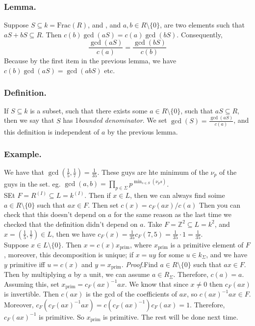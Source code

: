 \documentclass{article}
\newcommand{\vs}{\bigskip\\\text{}}
\newcommand{\beginproof}{\vspace{10pt}\newline\textit{Proof.}\hspace{1em}}
\begin{document}
\subsubsection{Lemma.} Suppose $S\subseteq k = \text{Frac}(R)$, and , and $a,b \in R\setminus\{0\}$, are two elements
such that $aS + bS \subseteq R$. Then $c(b) \gcd(aS) = c(a) \gcd(bS)$. Consequently, 
\[
 \frac{\gcd(aS)}{c(a)} = \frac{\gcd(bS)}{c(b)}
\]
Because by the first item in the previous lemma, we have $c(b) \gcd(aS) = \gcd(abS)$ etc.
\subsubsection{Definition.} If $S\subseteq k$ is a subset, such that there exists some $a\in R\setminus\{0\}$, such that
$aS \subseteq R$, then we say that $S$ has 1\textit{bounded denominator}. We set $\gcd(S) = \frac{\gcd(aS)}{c(a)}$, and
this definition is independent of $a$ by the previous lemma.
\subsubsection{Example.} We have that $\gcd(\frac{1}{5},\frac{1}{7}) = \frac{1}{35}$. These guys are hte minimum of the
$\nu_p$ of the guys in the set. eg. $\gcd(a,b) = \prod_{p\in \Sigma} p^{\min_{s\in S}(\nu_ps)}$.\vs
SEt $F = R^{(I)}\subseteq L = k^{(I)}$. Then if $x \in L$, then we can always find soime $a \in R\setminus\{0\}$ such
that $ax\in F$. Then set $c(x) = c_F(ax)/c(a)$ Then you can check that this doesn't depend on $a$ for the same reason as
the last time we checked that the definition didn't depend on $a$. Take $F = \mathbb{Z}^{2}\subseteq L = k^{2}$, and $x
= (\frac{1}{5},\frac{1}{7})\in L$, then we have $c_F(x) = \frac{1}{35}c_F(7,5) = \frac{1}{35}\cdot 1 = \frac{1}{35}$.\vs
Suppose $x\in L\setminus\{0\}$. Then $x = c(x) x_{\text{prim}}$, where $x_{\text{prim}}$ is a primitive element of $F$,
moreover, this decomposition is unique; if $x = uy$ for some $u \in k_\Sigma$, and we have $y$ primitive iff $u = c(x)$
and $y = x_{\text{prim}}$.
\beginproof Find $a\in R\setminus\{0\}$ such that $ax\in F$. Then by multiplying $a $ by a unit, we can assume $a \in
R_\Sigma$. Therefore, $c(a) = a$. Assuming this, set $x_\text{prim} = c_F(ax)^{-1}ax$. We know that since $x \neq 0$
then $c_F(ax)$ is invertible. Then $c(ax)$ is the gcd of the coefficients of $ax$, so $c(ax)^{-1}ax \in F$. Moreover,
$c_F(c_F(ax)^{-1}ax) = c(c_F(ax)^{-1})c_F(ax) = 1$. Therefore, $c_F(ax)^{-1}$ is primitive. So $x_\text{prim}$ is
primitive. The rest will be done next time.
\end{document}
